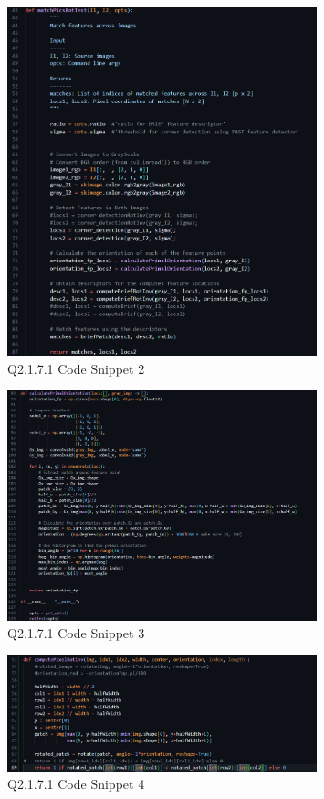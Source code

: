 \documentclass{article}
\begin{document}
	\begin{figure}[H]		
	\centering
	\includegraphics[width=0.8\textwidth]{Q2_1_7_1_cns2.png}  %
	\caption{Q2.1.7.1 Code Snippet 2}
	\label{fig:Q2171_cns2}
	\end{figure}		
	\begin{figure}[H]		
	\centering
	\includegraphics[width=0.8\textwidth]{Q2_1_7_1_cns3.png}  %
	\caption{Q2.1.7.1 Code Snippet 3}
	\label{fig:Q2171_cns3}
	\end{figure}
	\begin{figure}[H]		
	\centering
	\includegraphics[width=0.8\textwidth]{Q2_1_7_1_cns4.png}  %
	\caption{Q2.1.7.1 Code Snippet 4}
	\label{fig:Q2171_cns4}
	\end{figure}
	
\end{document}
